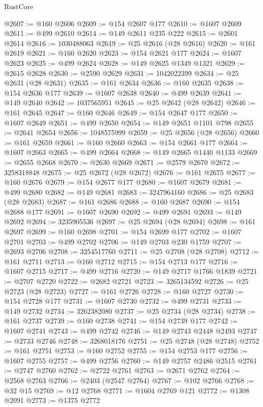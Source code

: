 \begin{lexlean}{RustCore}
\begin{coremodule}
@2607 := @160 @2606
@2609 := @154 @2607 @177
@2610 := @1607 @2609
@2611 := @499 @2610
@2614 := @149 @2611 @235 @222
@2615 := @2601 @2614
@2616 := 1030488063
@2619 := @25 @2616 (@28 @2616)
@2620 := @161 @2619
@2621 := @160 @2620
@2623 := @154 @2621 @177
@2624 := @1607 @2623
@2625 := @499 @2624
@2628 := @149 @2625 @1349 @1321
@2629 := @2615 @2628
@2630 := @2590 @2629
@2631 := 1042022399
@2634 := @25 @2631 (@28 @2631)
@2635 := @161 @2634
@2636 := @160 @2635
@2638 := @154 @2636 @177
@2639 := @1607 @2638
@2640 := @499 @2639
@2641 := @149 @2640
@2642 := 1037565951
@2645 := @25 @2642 (@28 @2642)
@2646 := @161 @2645
@2647 := @160 @2646
@2649 := @154 @2647 @177
@2650 := @1607 @2649
@2651 := @499 @2650
@2654 := @149 @2651 @1101 @798
@2655 := @2641 @2654
@2656 := 1048575999
@2659 := @25 @2656 (@28 @2656)
@2660 := @161 @2659
@2661 := @160 @2660
@2663 := @154 @2661 @177
@2664 := @1607 @2663
@2665 := @499 @2664
@2668 := @149 @2665 @1440 @1133
@2669 := @2655 @2668
@2670 := @2630 @2669
@2671 := @2579 @2670
@2672 := 3258318848
@2675 := @25 @2672 (@28 @2672)
@2676 := @161 @2675
@2677 := @160 @2676
@2679 := @154 @2677 @177
@2680 := @1607 @2679
@2681 := @499 @2680
@2682 := @149 @2681
@2683 := 3247964160
@2686 := @25 @2683 (@28 @2683)
@2687 := @161 @2686
@2688 := @160 @2687
@2690 := @154 @2688 @177
@2691 := @1607 @2690
@2692 := @499 @2691
@2693 := @149 @2692
@2694 := 3235905536
@2697 := @25 @2694 (@28 @2694)
@2698 := @161 @2697
@2699 := @160 @2698
@2701 := @154 @2699 @177
@2702 := @1607 @2701
@2703 := @499 @2702
@2706 := @149 @2703 @230 @1759
@2707 := @2693 @2706
@2708 := 3254517760
@2711 := @25 @2708 (@28 @2708)
@2712 := @161 @2711
@2713 := @160 @2712
@2715 := @154 @2713 @177
@2716 := @1607 @2715
@2717 := @499 @2716
@2720 := @149 @2717 @1766 @1839
@2721 := @2707 @2720
@2722 := @2682 @2721
@2723 := 3265134592
@2726 := @25 @2723 (@28 @2723)
@2727 := @161 @2726
@2728 := @160 @2727
@2730 := @154 @2728 @177
@2731 := @1607 @2730
@2732 := @499 @2731
@2733 := @149 @2732
@2734 := 3262382080
@2737 := @25 @2734 (@28 @2734)
@2738 := @161 @2737
@2739 := @160 @2738
@2741 := @154 @2739 @177
@2742 := @1607 @2741
@2743 := @499 @2742
@2746 := @149 @2743 @2448 @2493
@2747 := @2733 @2746
@2748 := 3268018176
@2751 := @25 @2748 (@28 @2748)
@2752 := @161 @2751
@2753 := @160 @2752
@2755 := @154 @2753 @177
@2756 := @1607 @2755
@2757 := @499 @2756
@2760 := @149 @2757 @2486 @2515
@2761 := @2747 @2760
@2762 := @2722 @2761
@2763 := @2671 @2762
@2764 := @2568 @2763
@2766 := @2403 (@2547 @2764)
@2767 := @102 @2766
@2768 := @32 @15
@2769 := @12 @2768
@2771 := @1604 @2769 @121
@2772 := @1308 @2091
@2773 := @1375 @2772

\end{coremodule}
\end{lexlean}
